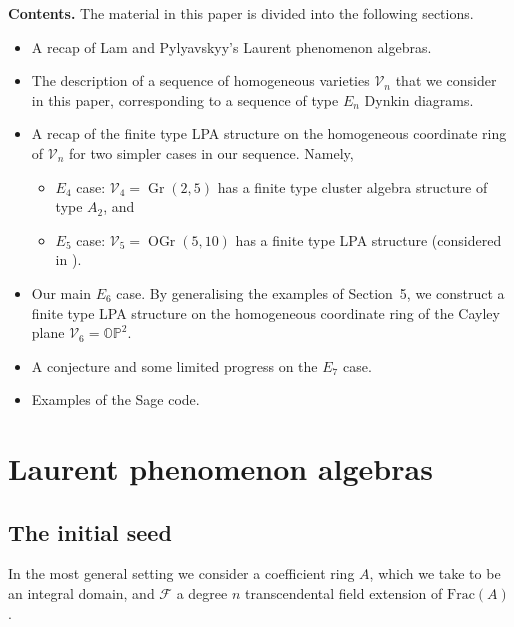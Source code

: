 \documentclass[pdftex]{sigma}
\numberwithin{equation}{section}
\theoremstyle{definition}
\DeclareMathOperator{\Gr}{Gr}
\DeclareMathOperator{\OGr}{OGr}
\begin{document}
{\bf Contents.}
The material in this paper is divided into the following sections.
\begin{itemize}\itemsep=0pt
\item[\S2] A recap of Lam and Pylyavskyy's Laurent phenomenon algebras.
\item[\S3] The description of a sequence of homogeneous varieties $\mathcal V_n$ that we consider in this paper, corresponding to a sequence of type $E_n$ Dynkin diagrams.
\item[\S4] A recap of the finite type LPA structure on the homogeneous coordinate ring of $\mathcal V_n$ for two simpler cases in our sequence. Namely,
\begin{itemize}\itemsep=0pt
\item[{}]{$E_4$ case:} $\mathcal V_4=\Gr(2,5)$ has a finite type cluster algebra structure of type $A_2$, and
\item[{}]{$E_5$ case:} $\mathcal V_5=\OGr(5,10)$ has a finite type LPA structure (considered in \cite{duc}).
\end{itemize}
\item[\S5] Our main $E_6$ case. By generalising the examples of Section~5, we construct a finite type LPA structure on the homogeneous coordinate ring of the Cayley plane $\mathcal V_6=\mathbb{OP}^2$.
\item[\S6] A conjecture and some limited progress on the $E_7$ case.
\item[\S{A}] Examples of the Sage code.
\end{itemize}

\section{Laurent phenomenon algebras}

\subsection{The initial seed}

In the most general setting we consider a coefficient ring $A$, which we take to be an integral domain, and $\mathcal{F}$ a degree $n$ transcendental field extension of $\text{Frac}(A)$.
\end{document}
